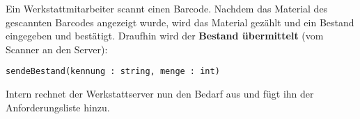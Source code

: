 Ein Werkstattmitarbeiter scannt einen Barcode. Nachdem das Material des gescannten Barcodes angezeigt wurde, wird das Material gezählt und ein Bestand eingegeben und bestätigt. Draufhin wird der \textbf{Bestand übermittelt} (vom Scanner an den Server):

\texttt{sendeBestand(kennung : string, menge : int)}

Intern rechnet der Werkstattserver nun den Bedarf aus und fügt ihn der Anforderungsliste hinzu.